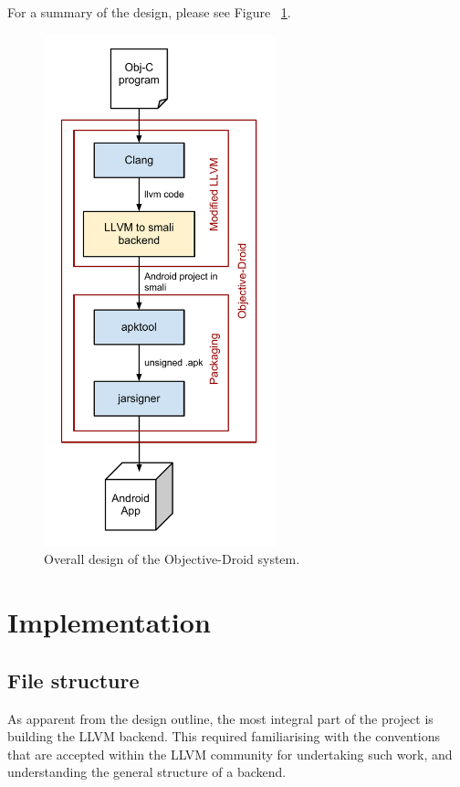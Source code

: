 \documentclass[parskip]{cs4rep}
\begin{document}
For a summary of the design, please see Figure ~\ref{fig:design}.

\begin{figure}[htp]
  \label{fig:design}
  \caption{Overall design of the Objective-Droid system.}
  \centering
    \includegraphics[width=0.6\textwidth]{design}
\end{figure}

\section{Implementation}

\subsection{File structure}

As apparent from the design outline, the most integral part of the project is building the LLVM backend. This required familiarising with the conventions that are accepted within the LLVM community for undertaking such work, and understanding the general structure of a backend.
\end{document}
